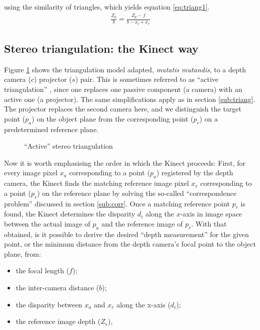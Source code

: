 using the similarity of triangles, which yields equation
\ref{eq:triang1}.
\begin{align} \label{eq:triang1}
    \frac{Z_p}{b} = \frac{Z_p - f}{b - x_l + x_r}
\end{align}


\subsection{Stereo triangulation: the Kinect way}

Figure \ref{fig:atriang} shows the triangulation model adapted, \emph{mutatis
mutandis}, to a depth camera ($c$) projector ($s$) pair. This is sometimes
referred to as ``active triangulation'' \cite{alexander1987}, since one replaces
one passive component (a camera) with an active one (a projector). The same
simplifications apply as in section \ref{sub:triang}. The projector replaces the
second camera here, and we distinguish the target point ($p_a$) on the object
plane from the corresponding point ($p_r$) on a predetermined reference plane.

\begin{figure}[ht]
    \begin{center}
        
        \caption{``Active'' stereo triangulation}
        \label{fig:atriang}
    \end{center}
\end{figure}

Now it is worth emphasising the order in which the Kinect proceeds: First, for
every image pixel $x_a$ corresponding to a point ($p_a$) registered by the depth
camera, the Kinect finds the matching reference image pixel $x_r$ corresponding
to a point ($p_r$) on the reference plane by solving the so-called
``correspondence problem'' discussed in section \ref{sub:corr}. Once a matching
reference point $p_r$ is found, the Kinect determines the disparity $d_i$ along
the $x$-axis in image space between the actual image of $p_a$ and the reference
image of $p_r$. With that obtained, is it possible to derive the desired ``depth
measurement'' for the given point, or the minimum distance from the depth
camera's focal point to the object plane, from: 
\begin{itemize}

    \item the focal length ($f$);

    \item the inter-camera distance ($b$);

    \item the disparity between $x_a$ and $x_r$ along the x-axis ($d_i$);

    \item the reference image depth ($Z_r$),

\end{itemize}

